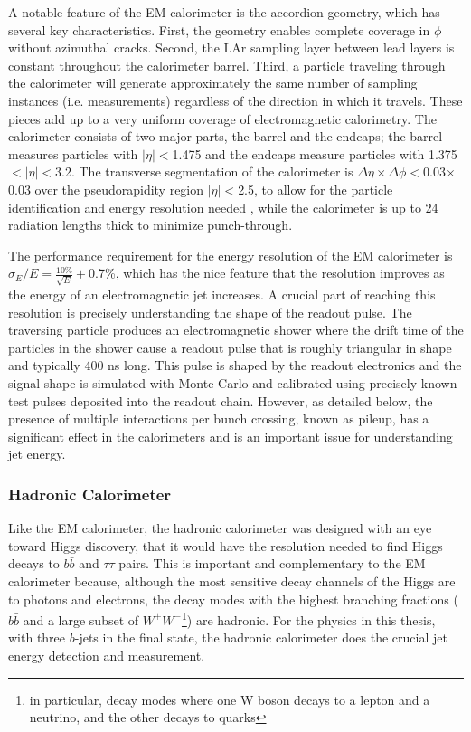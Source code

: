 A notable feature of the EM calorimeter is the accordion geometry, which has several key characteristics.  First, 
the geometry enables complete coverage in $\phi$ without azimuthal cracks.  Second, the LAr sampling layer between 
lead layers is constant throughout the calorimeter barrel.  Third, a particle traveling through the calorimeter will generate approximately 
the same number of sampling instances (i.e. measurements) regardless of the direction in which it 
travels.  These pieces add up to a very uniform coverage of electromagnetic calorimetry.  The calorimeter consists of two 
major parts, the barrel and the endcaps; the barrel measures particles with $|\eta|<$1.475 
and the endcaps measure particles with 1.375$<|\eta|<$3.2.  The transverse segmentation of the calorimeter
is $\Delta\eta \times \Delta\phi<$0.03$\times$ 0.03 over the pseudorapidity region $|\eta|<$2.5,  
to allow for the particle identification and energy resolution needed \cite{cal_tdr}, while the 
calorimeter is up to 24 radiation lengths thick to minimize punch-through.

The performance requirement for the energy resolution of the EM calorimeter is 
$\sigma_E/E=\frac{10\%}{\sqrt{E}}+$0.7\%, which has the nice feature that the resolution improves
as the energy of an electromagnetic jet increases.
A crucial part of reaching this resolution is precisely understanding the shape of the readout pulse.  The traversing particle 
produces an electromagnetic shower where the drift time of the particles in the shower cause a readout pulse that is 
roughly triangular in shape and typically 400 ns long.  This pulse is shaped by the readout electronics and the 
signal shape is simulated with Monte Carlo and calibrated using precisely known test pulses deposited into the readout chain.  
However, as detailed below, the presence of multiple interactions per bunch crossing, known as pileup, has 
a significant effect in the calorimeters and is an important issue for understanding jet energy.

\subsubsection{Hadronic Calorimeter} 
\label{sec:h_cal}
Like the EM calorimeter, the hadronic calorimeter was designed with an eye toward Higgs discovery, that it would
have the resolution needed to find Higgs decays to $b\bar{b}$ and $\tau\tau$ pairs.  This is important and complementary
to the EM calorimeter because, although the most sensitive decay channels of the Higgs are to photons and electrons,
the decay modes with the highest branching fractions ($b\bar{b}$ and a large subset of $W^+W^-$\footnote{in particular,
decay modes where one W boson decays to a lepton and a neutrino, and the other decays to quarks}) are hadronic.
For the physics in this thesis, with three $b$-jets in the final state, the hadronic calorimeter does the crucial
jet energy detection and measurement. 

